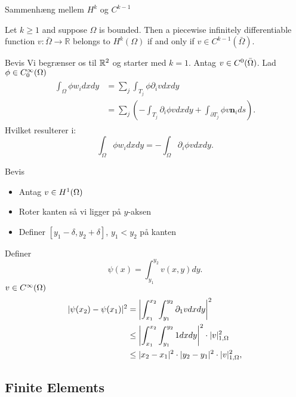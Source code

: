 \begin{frame}{Sammenhæng mellem $H^k$ og $C^{k-1}$}
   \begin{theorem}
    Let $k\geq1$ and suppose $\Omega$ is bounded. Then a piecewise infinitely differentiable function $v:\bar{\Omega}\rightarrow \mathbb{R}$
    belongs to $H^k(\Omega)$ if and only if $v\in C^{k-1}(\bar{\Omega})$.
   \end{theorem} 
\end{frame}
\begin{frame}{Bevis}
    Vi begrænser os til $\mathbb{R}^2$ og starter med $k=1$. Antag $v\in C^0(\bar{\Omega})$. 
    Lad $\phi \in C^\infty_0(\Omega)$
    \begin{align}
    \begin{split}
    \int_\Omega \phi w_i dxdy &= \sum_j\int_{T_j} \phi \partial_i v dx dy \\
        &= \sum_j \left( -\int_{T_j} \partial_i \phi v dxdy + \int_{\partial T_j} \phi v \mathbf{n}_i ds\right).
    \end{split}
    \end{align}
    Hvilket resulterer i:
    \begin{equation}
        \int_\Omega \phi w_i dxdy = -\int_\Omega \partial_i \phi v dxdy.
    \end{equation}
\end{frame}
\begin{frame}{Bevis}
   \begin{itemize}
    \item Antag $v\in H^1(\Omega)$ 
    \item Roter kanten så vi ligger på $y$-aksen 
    \item Definer $[y_1-\delta, y_2 +\delta]$, $y_1<y_2$ på kanten
   \end{itemize} 
   Definer 
    \begin{equation}
        \psi (x) = \int_{y_1}^{y_2} v(x,y) dy.
    \end{equation}
    $v\in C^\infty(\Omega)$
    \begin{align}
        |\psi(x_2) -\psi(x_1)|^2 &= \left| \int_{x_1}^{x_2} \int_{y_1}^{y_2} \partial_1 v dx dy \right|^2\\
        &\leq \left| \int_{x_1}^{x_2} \int_{y_1}^{y_2} 1 dx dy \right|^2 \cdot | v |_{1, \Omega}^2\\
        &\leq |x_2 - x_1|^2 \cdot |y_2 - y_1|^2 \cdot | v |_{1, \Omega}^2,
    \end{align}
\end{frame}
\subsection{Finite Elements}


